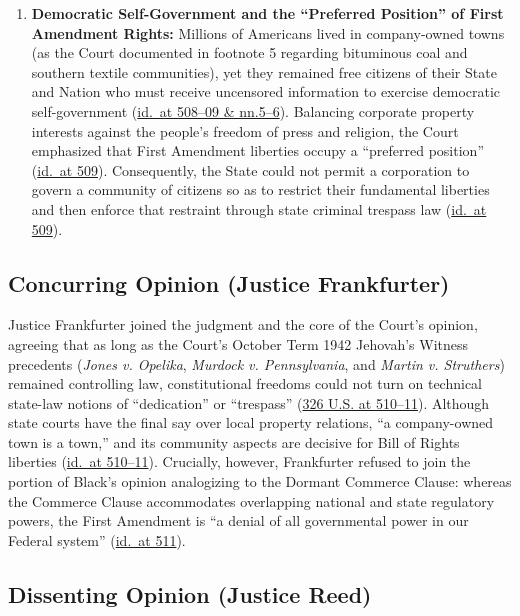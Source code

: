 \documentclass[12pt]{article}
\begin{document}
\begin{enumerate}
  \item \textbf{Democratic Self-Government and the ``Preferred Position'' of First Amendment Rights:} Millions of Americans lived in company-owned towns (as the Court documented in footnote 5 regarding bituminous coal and southern textile communities), yet they remained free citizens of their State and Nation who must receive uncensored information to exercise democratic self-government (\href{https://supreme.justia.com/cases/federal/us/326/501/}{id.\ at 508--09 \& nn.5--6}). Balancing corporate property interests against the people's freedom of press and religion, the Court emphasized that First Amendment liberties occupy a ``preferred position'' (\href{https://supreme.justia.com/cases/federal/us/326/501/}{id.\ at 509}). Consequently, the State could not permit a corporation to govern a community of citizens so as to restrict their fundamental liberties and then enforce that restraint through state criminal trespass law (\href{https://supreme.justia.com/cases/federal/us/326/501/}{id.\ at 509}).
\end{enumerate}

\subsection{Concurring Opinion (Justice Frankfurter)}

Justice Frankfurter joined the judgment and the core of the Court's opinion, agreeing that as long as the Court's October Term 1942 Jehovah's Witness precedents (\textit{Jones v. Opelika}, \textit{Murdock v. Pennsylvania}, and \textit{Martin v. Struthers}) remained controlling law, constitutional freedoms could not turn on technical state-law notions of ``dedication'' or ``trespass'' (\href{https://supreme.justia.com/cases/federal/us/326/501/}{326 U.S. at 510--11}). Although state courts have the final say over local property relations, ``a company-owned town is a town,'' and its community aspects are decisive for Bill of Rights liberties (\href{https://supreme.justia.com/cases/federal/us/326/501/}{id.\ at 510--11}). Crucially, however, Frankfurter refused to join the portion of Black's opinion analogizing to the Dormant Commerce Clause: whereas the Commerce Clause accommodates overlapping national and state regulatory powers, the First Amendment is ``a denial of all governmental power in our Federal system'' (\href{https://supreme.justia.com/cases/federal/us/326/501/}{id.\ at 511}).

\subsection{Dissenting Opinion (Justice Reed)}
\end{document}
